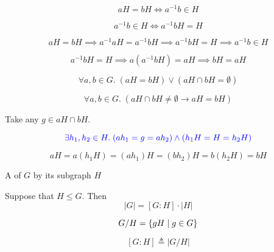\begin{frame}
  \[
    aH = bH \iff a^{-1}b \in H
  \]

  \pause
  \[
    \boxed{a^{-1}b \in H \iff a^{-1}b H = H}
  \]

  \pause
  \[
    aH = bH \implies a^{-1}aH = a^{-1}bH \implies a^{-1}bH = H \implies a^{-1}b \in H
  \]

  \pause
  \[
    a^{-1}b H = H \implies a(a^{-1}bH) = aH \implies bH = aH
  \]
\end{frame}

\begin{frame}
  \[
    \forall a, b \in G.\; (aH = bH) \lor (aH \cap bH = \emptyset)
  \]

  \pause
  \[
    \forall a, b \in G.\; (aH \cap bH \neq \emptyset \to aH = bH)
  \]

  \pause
  \vspace{0.30cm}
  \begin{center}
    Take any $g \in aH \cap bH$.
  \end{center}

  \pause
  \[
    \textcolor{blue}{\exists h_{1}, h_{2} \in H.\;
      (ah_{1} = g = ah_{2}) \land (h_{1}H = H = h_{2}H)}
  \]

  \pause
  \[
    aH = a(h_{1}H) = (ah_{1})H = (bh_{2})H = b(h_{2}H) = bH
  \]
\end{frame}

\begin{frame}
  \begin{center}
    A   of $G$ by its subgraph $H$
  \end{center}

\end{frame}

\begin{frame}
  \begin{theorem}
    Suppose that $H \le G$. Then
    \[
      |G| = [G : H] \cdot |H|
    \]
  \end{theorem}

  \vspace{0.50cm}
  \begin{definition}[Index (指标)]
    \[
      G/H = \{gH \mid g \in G\}
    \]

    \[
      [G : H] \triangleq |G/H|
    \]
  \end{definition}
\end{frame}

